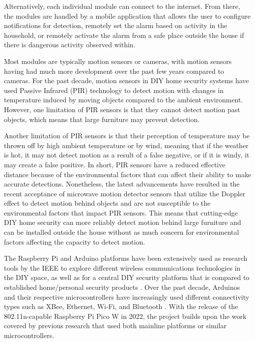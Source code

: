 Alternatively, each individual module can connect to the internet. \cite{sarhan2020} From
there, the modules are handled by a mobile application that allows the user to configure
notifications for detection, remotely set the alarm based on activity in the household, or
remotely activate the alarm from a safe place outside the house if there is dangerous
activity observed within. \cite{joseMalekian2017}

Most modules are typically motion sensors or cameras, with motion sensors having had
much more development over the past few years compared to cameras. For the past decade,
motion sensors in DIY home security systems have used Passive Infrared (PIR) technology to
detect motion with changes in temperature induced by moving objects compared to the ambient
environment. \cite{sarhan2020} However, one limitation of PIR sensors is that they cannot
detect motion past objects, which means that large furniture may prevent detection.

Another limitation of PIR sensors is that their perception of temperature may be thrown off
by high ambient temperature or by wind, meaning that if the weather is hot, it may not detect
motion as a result of a false negative, or if it is windy, it may create a false
positive. In short, PIR sensors have a reduced effective distance because
of the environmental factors that can affect their ability to make accurate detections.
Nonetheless, the latest advancements have resulted in the recent acceptance of microwave
motion detector sensors that utilize the Doppler effect to detect motion behind objects
and are not susceptible to the environmental factors that impact PIR sensors.
\cite{sarhan2020} This means that cutting-edge DIY home security can more reliably detect
motion behind large furniture and can be installed outside the house without as much concern
for environmental factors affecting the capacity to detect motion.

The Raspberry Pi and Arduino platforms have been extensively used as research tools by the
IEEE to explore different wireless communications technologies in the DIY space, as well as
for a central DIY security platform that is compared to established home/personal security
products \cite{sarhan2020}. Over the past decade, Arduinos and their respective
microcontrollers have increasingly used different connectivity types such as XBee, Ethernet,
Wi-Fi, and Bluetooth \cite{sarhan2020} \cite{HameedEtAl2022}. With the release of the
802.11n-capable Raspberry Pi Pico W in 2022, the project builds upon the work covered by
previous research that used both mainline platforms or similar microcontrollers.